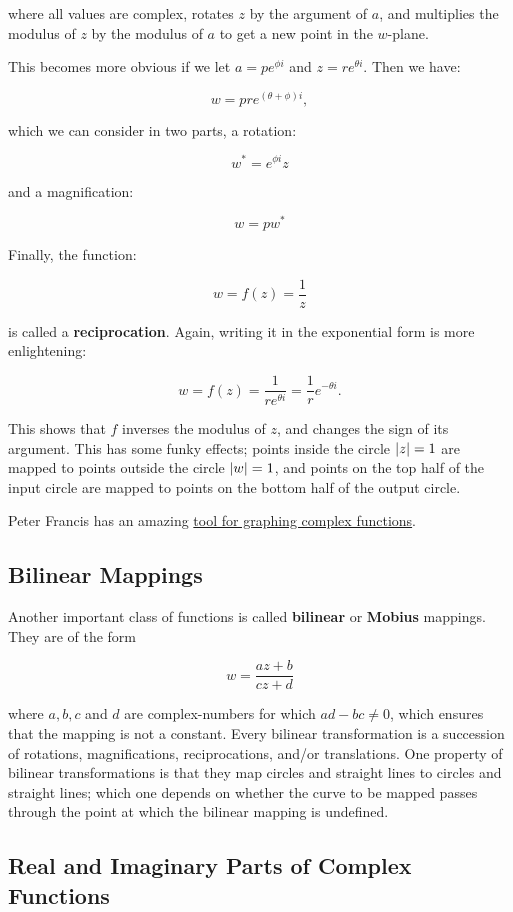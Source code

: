 \documentclass{article}
\begin{document}
where all values are complex, rotates $z$ by the argument of $a$, and multiplies the modulus of $z$ by the modulus of $a$ to get a new point in the $w$-plane.

This becomes more obvious if we let $a = pe^{\phi i}$ and $z = re^{\theta i}$. Then we have:

\[ w = pre^{(\theta + \phi)i}, \]

which we can consider in two parts, a rotation:

\[ w^* = e^{\phi i}z \]

and a magnification:

\[ w = pw^* \]

Finally, the function:

\[ w = f(z) = \frac{1}{z} \]

is called a \textbf{reciprocation}. Again, writing it in the exponential form is more enlightening:

\[ w = f(z) = \frac{1}{re^{\theta i}} = \frac{1}{r} e^{-\theta i }. \]

This shows that $f$ inverses the modulus of $z$, and changes the sign of its argument. This has some funky effects; points inside the circle $\left| z \right| = 1$ are mapped to points outside the circle $\left| w \right| = 1$, and points on the top half of the input circle are mapped to points on the bottom half of the output circle.

Peter Francis has an amazing \href{https://peterefrancis.com/complex-function-plot/index.html}{tool for graphing complex functions}.

\subsection{Bilinear Mappings}

Another important class of functions is called \textbf{bilinear} or \textbf{Mobius} mappings. They are of the form

\[ w = \frac{az + b}{cz + d} \]

where $a, b, c$ and $d$ are \@{complex-numbers} for which $ad - bc \neq 0$, which ensures that the mapping is not a constant. Every bilinear transformation is a succession of rotations, magnifications, reciprocations, and/or translations. One property of bilinear transformations is that they map circles and straight lines to circles and straight lines; which one depends on whether the curve to be mapped passes through the point at which the bilinear mapping is undefined.

\subsection{Real and Imaginary Parts of Complex Functions}
\end{document}
